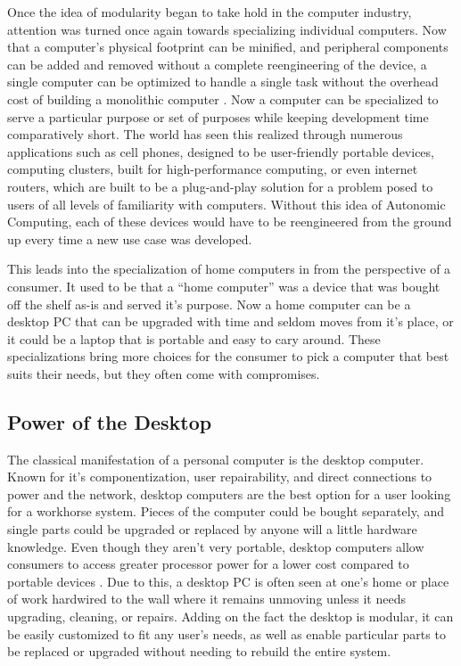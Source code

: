 Once the idea of modularity began to take hold in the computer industry, attention was turned once again towards specializing individual computers.
Now that a computer's physical footprint can be minified, and peripheral components can be added and removed without a complete reengineering of the device, a single computer can be optimized to handle a single task without the overhead cost of building a monolithic computer \cite{Burbeck2007ComplexityAT}.
Now a computer can be specialized to serve a particular purpose or set of purposes while keeping development time comparatively short.
The world has seen this realized through numerous applications such as cell phones, designed to be user-friendly portable devices, computing clusters, built for high-performance computing, or even internet routers, which are built to be a plug-and-play solution for a problem posed to users of all levels of familiarity with computers.
Without this idea of Autonomic Computing, each of these devices would have to be reengineered from the ground up every time a new use case was developed.

This leads into the specialization of home computers in from the perspective of a consumer.
It used to be that a \enquote{home computer} was a device that was bought off the shelf as-is and served it's purpose.
Now a home computer can be a desktop PC that can be upgraded with time and seldom moves from it's place, or it could be a laptop that is portable and easy to cary around.
These specializations bring more choices for the consumer to pick a computer that best suits their needs, but they often come with compromises.

\subsection{Power of the Desktop}\label{subsec:PowerOfTheDesktop}

The classical manifestation of a personal computer is the desktop computer.
Known for it's componentization, user repairability, and direct connections to power and the network, desktop computers are the best option for a user looking for a workhorse system.
Pieces of the computer could be bought separately, and single parts could be upgraded or replaced by anyone will a little hardware knowledge.
Even though they aren't very portable, desktop computers allow consumers to access greater processor power for a lower cost compared to portable devices \cite{Meyer20145RS}.
Due to this, a desktop PC is often seen at one's home or place of work hardwired to the wall where it remains unmoving unless it needs upgrading, cleaning, or repairs.
Adding on the fact the desktop is modular, it can be easily customized to fit any user's needs, as well as enable particular parts to be replaced or upgraded without needing to rebuild the entire system.

